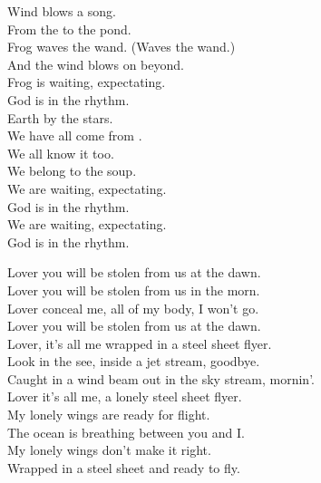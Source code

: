 Wind blows a song. \\
From the  to the pond. \\
Frog waves the wand. (Waves the wand.) \\
And the wind blows on beyond. \\

Frog is waiting, expectating. \\
God is in the rhythm. \\

Earth by the stars. \\
We have all come from . \\
We all know it too. \\
We belong to the soup. \\

We are waiting, expectating. \\
God is in the rhythm. \\

We are waiting, expectating. \\
God is in the rhythm. \\




Lover you will be stolen from us at the dawn. \\
Lover you will be stolen from us in the morn. \\
Lover conceal me, all of my body, I won't go. \\
Lover you will be stolen from us at the dawn. \\

Lover, it's all me wrapped in a steel sheet flyer. \\
Look in the  see, inside a jet stream, goodbye. \\
Caught in a wind beam out in the sky stream, mornin'. \\
Lover it's all me, a lonely steel sheet flyer. \\

My lonely wings are ready for flight. \\
The ocean is breathing between you and I. \\
My lonely wings don't make it right. \\
Wrapped in a steel sheet and ready to fly. \\

